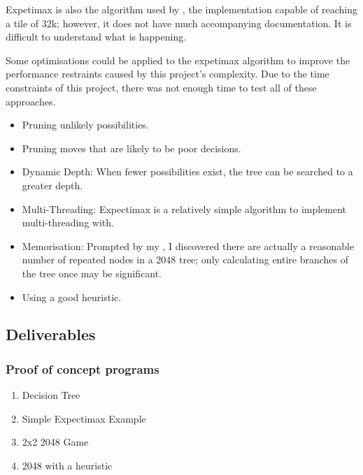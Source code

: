 \documentclass{article}
\begin{document}
Expetimax is also the algorithm used by \cite{_16k2048ai}, the implementation capable of reaching a tile of 32k; however, it does not have much accompanying documentation. It is difficult to understand what is happening.

Some optimisations could be applied to the expetimax algorithm to improve the performance restraints caused by this project's complexity. Due to the time constraints of this project, there was not enough time to test all of these approaches.
\begin{itemize}
    \item Pruning unlikely possibilities.
    \item Pruning moves that are likely to be poor decisions.
    \item Dynamic Depth: When fewer possibilities exist, the tree can be searched to a greater depth.
    \item Multi-Threading: Expectimax is a relatively simple algorithm to implement multi-threading with.
    \item Memorisation: Prompted by my \cite{_16k2048ai}, I discovered there are actually a reasonable number of repeated nodes in a 2048 tree; only calculating entire branches of the 
    tree once may be significant.
    \item Using a good heuristic.
\end{itemize}

\subsection{Deliverables}
\label{subsec:deliverable}
\subsubsection{Proof of concept programs}
\begin{enumerate}
    \item Decision Tree
    \item Simple Expectimax Example
    \item 2x2 2048 Game
    \item 2048 with a heuristic
\end{enumerate}
\end{document}
